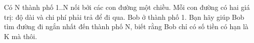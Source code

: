Có N thành phố 1..N nối bởi các con đường một chiều. Mỗi con đường có hai giá trị: độ dài và chi phí phải trả để đi qua. Bob ở thành phố 1. Bạn hãy giúp Bob tìm đường đi ngắn nhất đến thành phố N, biết rằng Bob chỉ có số tiền có hạn là K mà thôi.